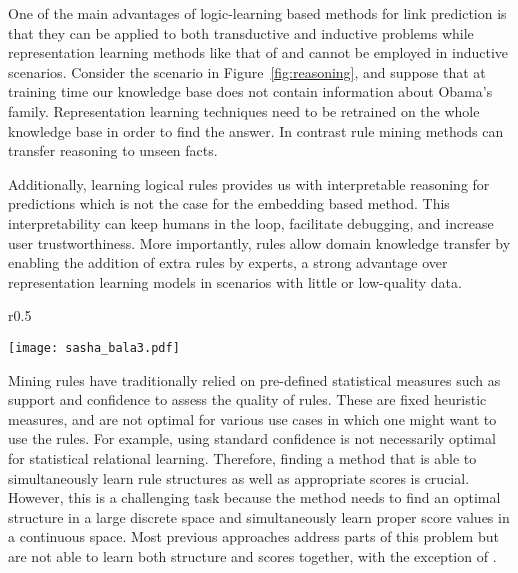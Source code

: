 \documentclass{article}
\begin{document}
One of the main advantages of logic-learning based methods for link prediction is that they can be applied to both transductive and inductive problems while representation learning methods like that of \citet{bordes2013translating,sadeghian2016temporal} and \citet{Yang2015EmbeddingEA} cannot be employed in inductive scenarios. Consider the scenario in Figure~\ref{fig:reasoning}, and suppose that at training time our knowledge base does not contain information about Obama's family.  Representation learning techniques need to be retrained on the whole knowledge base in order to find the answer. In contrast rule mining methods can transfer reasoning to unseen facts.  

Additionally, learning logical rules provides us with interpretable reasoning for predictions which is not the case for the embedding based method. This interpretability can keep humans in the loop, facilitate debugging, and increase user trustworthiness. More importantly, rules allow domain knowledge transfer by enabling the addition of extra rules by experts, a strong advantage over representation learning models in scenarios with little or low-quality data. 

\begin{wrapfigure}{r}{0.5\textwidth}
  \begin{center}
    \texttt{[image: sasha\_bala3.pdf]}
  \end{center}
  \caption{Using logical rules for knowledge base reasoning}
  \vspace{-7pt}
  \label{fig:reasoning}
\end{wrapfigure}

Mining rules have traditionally relied on pre-defined statistical measures such as support and confidence to assess the quality of rules. These are fixed heuristic measures, and are not optimal for various use cases in which one might want to use the rules. For example, using standard confidence is not necessarily optimal for statistical relational learning. Therefore, finding a method that is able to simultaneously learn rule structures as well as appropriate scores is crucial. However, this is a challenging task because the method needs to find an optimal structure in a large discrete space and simultaneously learn proper score values in a continuous space. Most previous approaches address parts of this problem \citep{de2015inducing,kok2007statistical, lao2011random, wang2014structure} but are not able to learn both structure and scores together, with the exception of \citet{yang2017differentiable}.  
\end{document}

